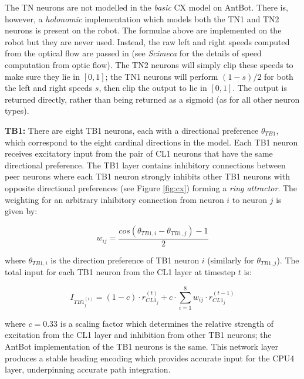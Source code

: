 \documentclass[a4paper,11pt,twoside,openright]{article}
\begin{document}
The TN neurons are not modelled in the \textit{basic} CX model on AntBot. There
is, however, a \textit{holonomic} implementation which models both the TN1 and
TN2 neurons is present on the robot. The formulae above are implemented on the
robot but they are never used. Instead, the raw left and right speeds computed
from the optical flow are passed in (see \textit{Scimeca} \cite{Scimeca2017} for
the details of speed computation from optic flow). The TN2 neurons will simply
clip these speeds to make sure they lie in $[0,1]$; the TN1 neurons will perform
$(1 - s) / 2$ for both the left and right speeds $s$, then clip the output to lie
in $[0,1]$. The output is returned directly, rather than being returned as a
sigmoid (as for all other neuron types).
\newline
\par

\textbf{TB1:}
There are eight TB1 neurons, each with a directional preference $\theta_{TB1}$,
which correspond to the eight cardinal directions in the model. Each TB1 neuron
receives excitatory input from the pair of CL1 neurons that have the same
directional preference. The TB1 layer contains inhibitory connections between
peer neurons where each TB1 neuron strongly inhibits other TB1 neurons with
opposite directional preferences (see Figure \ref{fig:cx}) forming a
\textit{ring attractor}\cite{Stone2017}. The weighting for an arbitrary
inhibitory connection from neuron $i$ to neuron $j$ is given by:

\begin{equation}
  w_{ij} =
  \frac{cos(\theta_{TB1,i} - \theta_{TB1,j}) - 1}{2}
\end{equation}

where $\theta_{TB1,i}$ is the direction preference of TB1 neuron $i$ (similarly
for $\theta_{TB1,j}$). The total input for each TB1 neuron from the CL1 layer
at timestep $t$ is:

\begin{equation}
  I_{TB1_{j}^{(t)}} =
  (1 - c) \cdot r_{CL1_j}^{(t)} + c \cdot \sum_{i = 1}^{8} w_{ij}
  \cdot r_{CL1_j}^{(t - 1)}
\end{equation}

where $c = 0.33$ is a scaling factor which determines the relative strength
of excitation from the CL1 layer and inhibition from other TB1 neurons;
the AntBot implementation of the TB1 neurons is the same. This
network layer produces a stable heading encoding which provides accurate
input for the CPU4 layer, underpinning accurate path integration.
\newline
\par
\end{document}
